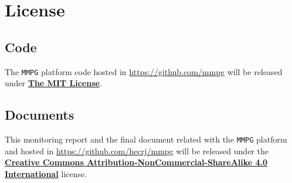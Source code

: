 \documentclass[a4paper,11pt]{article}
\begin{document}
\section{License}
\subsection{Code}
The \texttt{MMPG} platform code hosted in \url{https://github.com/mmpg} will be released under
\href{https://opensource.org/licenses/MIT}{\textbf{The MIT License}}.
\subsection{Documents}
This monitoring report and the final document related with the \texttt{MMPG} platform and hosted in
\url{https://github.com/hecrj/mmpg} will be released under the
\href{http://creativecommons.org/licenses/by-nc-sa/4.0/legalcode.txt}{\textbf{Creative Commons Attribution-NonCommercial-ShareAlike 4.0 International}}
license.
\clearpage


\end{document}
